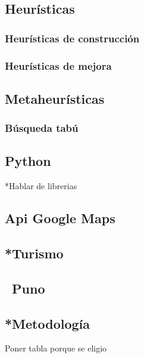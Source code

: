 \subsection{Heurísticas} %
\subsubsection{Heurísticas de construcción}
\subsubsection{Heurísticas de mejora}

\subsection{Metaheurísticas}
\subsubsection{Búsqueda tabú}

\subsection{Python}
*Hablar de librerias
\subsection{Api Google Maps}

\subsection{*Turismo}

\subsection{~Puno}

\subsection{*Metodología}
Poner tabla porque se eligio